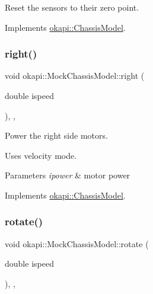 Reset the sensors to their zero point. 



Implements \mbox{\hyperlink{classokapi_1_1ChassisModel_a6bd7e6bb60d41d3f1f5a5a129acfe1b6}{okapi\+::\+Chassis\+Model}}.

\mbox{\label{classokapi_1_1MockChassisModel_af9c3d9fb7c4390fb73f6853c5fbbbb32}} 
\subsubsection{\texorpdfstring{right()}{right()}}
{\footnotesize\ttfamily void okapi\+::\+Mock\+Chassis\+Model\+::right (\begin{DoxyParamCaption}\item[{double}]{ispeed }\end{DoxyParamCaption})\hspace{0.3cm}{\ttfamily [inline]}, {\ttfamily [override]}, {\ttfamily [virtual]}}



Power the right side motors. 

Uses velocity mode.


\begin{DoxyParams}{Parameters}
{\em ipower} & motor power \\
\hline
\end{DoxyParams}


Implements \mbox{\hyperlink{classokapi_1_1ChassisModel_a282fcf947aea9630cadd2c673eb5f7e3}{okapi\+::\+Chassis\+Model}}.

\mbox{\label{classokapi_1_1MockChassisModel_afae0eded3e67bd83b4531c0c92f4d300}} 
\subsubsection{\texorpdfstring{rotate()}{rotate()}}
{\footnotesize\ttfamily void okapi\+::\+Mock\+Chassis\+Model\+::rotate (\begin{DoxyParamCaption}\item[{double}]{ispeed }\end{DoxyParamCaption})\hspace{0.3cm}{\ttfamily [inline]}, {\ttfamily [override]}, {\ttfamily [virtual]}}



